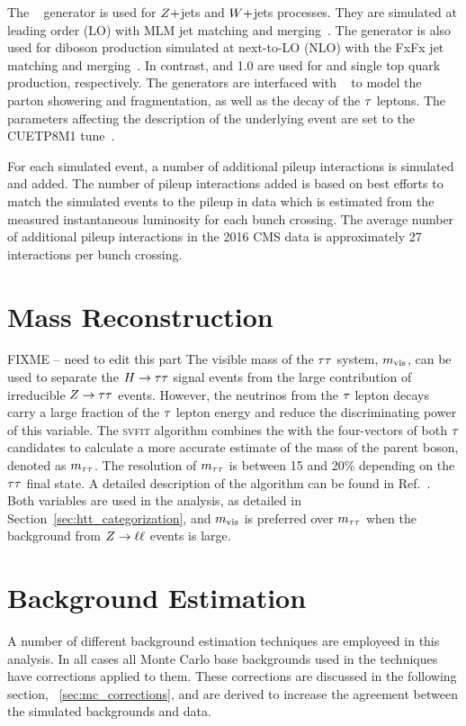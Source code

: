 The \MGAMCNLO~\cite{Alwall:2014hca} generator is used for $Z+$jets and $W+$jets processes. 
They are simulated at leading order (LO) with MLM jet matching and merging~\cite{Alwall:2007fs}.
The \MGAMCNLO generator is also used for diboson production simulated at next-to-LO (NLO) with the 
FxFx jet matching and merging~\cite{Frederix:2012ps}. In contrast,  and 1.0 are used for \ttbar
and single top quark production, respectively. The generators are interfaced with  ~\cite{Sjostrand:2014zea} to model the parton showering and fragmentation, as well as 
the decay of the $\tau$ leptons. The \PYTHIA parameters affecting the description of the 
underlying event are set to the {CUETP8M1} tune~\cite{Khachatryan:2015pea}.

For each simulated event, a number of additional pileup interactions is simulated and added. 
The number of pileup interactions added is based on best efforts to match the simulated
events to the pileup in data which is estimated from the measured instantaneous
luminosity for each bunch crossing. The average number of additional pileup interactions in
the 2016 CMS data is approximately 27 interactions per bunch crossing.


\section{Mass Reconstruction}
\label{sec:svfit}
FIXME -- need to edit this part
The visible mass of the $\tau\tau$ system, $m_\text{vis}$, can be used to separate
the $H\to \tau \tau$ signal events
from the large contribution of irreducible $Z \to \tau \tau$ events.
However, the neutrinos from the $\tau$ lepton decays carry a large fraction of
the $\tau$ lepton energy and reduce the discriminating power of this variable.
The \textsc{svfit} algorithm combines the \etvecmiss with the four-vectors of both $\tau$ candidates
to calculate a more accurate estimate of the mass of the parent boson, denoted as $m_{\tau\tau}$. 
The resolution of $m_{\tau\tau}$ is between 15 and 20\% depending on the $\tau\tau$ final state.
A detailed description of the algorithm can be found
in Ref.~\cite{Bianchini:2014vza}. Both variables are used in the analysis, as detailed in 
Section~\ref{sec:htt_categorization}, and $m_\text{vis}$ is preferred over $m_{\tau\tau}$ when the background 
from $Z \to \ell\ell$ events is large.


\section{Background Estimation}
\label{sec:background_estimation}
A number of different background estimation techniques are employeed in this
analysis. In all cases all Monte Carlo base backgrounds used in the techniques
have corrections applied to them. These corrections are discussed in the following
section, ~\ref{sec:mc_corrections}, and are derived to increase the agreement
between the simulated backgrounds and data.

